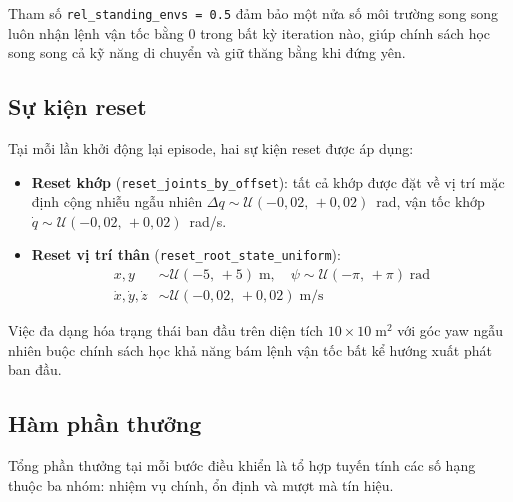 Tham số \texttt{rel\_standing\_envs = 0.5} đảm bảo một nửa số môi trường
song song luôn nhận lệnh vận tốc bằng 0 trong bất kỳ iteration nào,
giúp chính sách học song song cả kỹ năng di chuyển và giữ thăng bằng khi đứng yên.

\subsection{Sự kiện reset}

Tại mỗi lần khởi động lại episode, hai sự kiện reset được áp dụng:

\begin{itemize}
    \item \textbf{Reset khớp} (\texttt{reset\_joints\_by\_offset}): tất cả
    khớp được đặt về vị trí mặc định cộng nhiễu ngẫu nhiên
    $\Delta q \sim \mathcal{U}(-0{,}02,\,+0{,}02)$~rad,
    vận tốc khớp $\dot{q} \sim \mathcal{U}(-0{,}02,\,+0{,}02)$~rad/s.

    \item \textbf{Reset vị trí thân} (\texttt{reset\_root\_state\_uniform}):
    \begin{align*}
        x,y &\sim \mathcal{U}(-5,\,+5)\;\text{m}, \quad
        \psi \sim \mathcal{U}(-\pi,\,+\pi)\;\text{rad} \\
        \dot{x},\dot{y},\dot{z} &\sim \mathcal{U}(-0{,}02,\,+0{,}02)\;\text{m/s}
    \end{align*}
\end{itemize}

Việc đa dạng hóa trạng thái ban đầu trên diện tích $10\times10\;\text{m}^2$
với góc yaw ngẫu nhiên buộc chính sách học khả năng bám lệnh vận tốc
bất kể hướng xuất phát ban đầu.

\subsection{Hàm phần thưởng}

Tổng phần thưởng tại mỗi bước điều khiển là tổ hợp tuyến tính các số
hạng thuộc ba nhóm: nhiệm vụ chính, ổn định và mượt mà tín hiệu.

